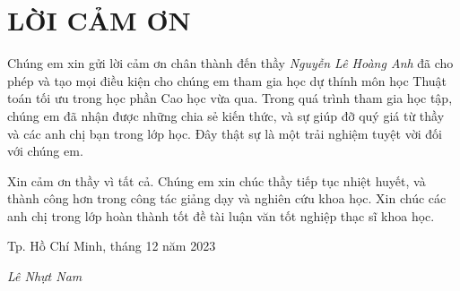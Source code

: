 \chapter*{LỜI CẢM ƠN}
Chúng em xin gửi lời cảm ơn chân thành đến thầy \emph{Nguyễn Lê Hoàng Anh} đã cho phép và tạo mọi điều kiện cho chúng em tham gia học dự thính môn học Thuật toán tối ưu trong học phần Cao học vừa qua. Trong quá trình tham gia học tập, chúng em đã nhận được những chia sẻ kiến thức, và sự giúp đỡ quý giá từ thầy và các anh chị bạn trong lớp học. Đây thật sự là một trải nghiệm tuyệt vời đối với chúng em.

Xin cảm ơn thầy vì tất cả. Chúng em xin chúc thầy tiếp tục nhiệt huyết, và thành công hơn trong công tác giảng dạy và nghiên cứu khoa học. Xin chúc các anh chị trong lớp hoàn thành tốt đề tài luận văn tốt nghiệp thạc sĩ khoa học.
\vspace{1cm}

\begin{flushright}
\begin{minipage}[t]{0.6\columnwidth}%

\begin{center}
Tp. Hồ Chí Minh,  tháng 12 năm 2023
\par\end{center}

\begin{center}
\emph{Lê Nhựt Nam}
\par\end{center}%
\end{minipage}
\par\end{flushright}